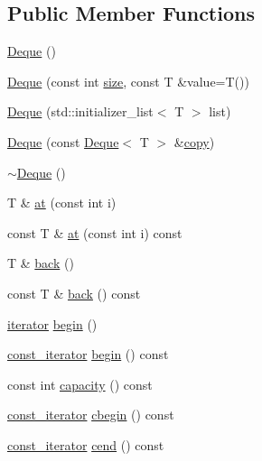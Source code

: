 \subsection*{Public Member Functions}
\begin{DoxyCompactItemize}
\item 
\hyperlink{classprism_1_1_deque_ae8fcffd4a0cf7dba0e33a6983641efc2}{Deque} ()
\item 
\hyperlink{classprism_1_1_deque_ac73ef5f071e6dfddf1f5e8a123752d3e}{Deque} (const int \hyperlink{classprism_1_1_deque_a38e141650506c5b320093c5bd5486a8c}{size}, const T \&value=T())
\item 
\hyperlink{classprism_1_1_deque_aa8c11433e26904fb8a46b912ea6617cf}{Deque} (std\+::initializer\+\_\+list$<$ T $>$ list)
\item 
\hyperlink{classprism_1_1_deque_abaa7ff51e27ef7acb0ca1afe523e7976}{Deque} (const \hyperlink{classprism_1_1_deque}{Deque}$<$ T $>$ \&\hyperlink{namespaceprism_ae776f4cd825f79e7af1cf6ee1d90a209}{copy})
\item 
\hyperlink{classprism_1_1_deque_a2a06b6247712d843c6f23df8ba807ca7}{$\sim$\+Deque} ()
\item 
T \& \hyperlink{classprism_1_1_deque_ab9a3b07245129d260da5d7c7c2aae0e9}{at} (const int i)
\item 
const T \& \hyperlink{classprism_1_1_deque_a6135342d2a41a6963feb2f2405b61930}{at} (const int i) const 
\item 
T \& \hyperlink{classprism_1_1_deque_a5d2f7cc35715a70ca9cd08867abc5683}{back} ()
\item 
const T \& \hyperlink{classprism_1_1_deque_acafb3ab76c43c84c35ba91a7b12d54d0}{back} () const 
\item 
\hyperlink{classprism_1_1_deque_af6fbdfa6e826f7f71b29f4d3cfb72ed1}{iterator} \hyperlink{classprism_1_1_deque_a8d0711ff8a7e810cad9b535c79b7f9b7}{begin} ()
\item 
\hyperlink{classprism_1_1_deque_afc2f71fd5b01e963e093f64cc4da94ec}{const\+\_\+iterator} \hyperlink{classprism_1_1_deque_afbb49ba1e2b3e2d59317625675f73106}{begin} () const 
\item 
const int \hyperlink{classprism_1_1_deque_ad787f6064309077863076b7a3c97d1c4}{capacity} () const 
\item 
\hyperlink{classprism_1_1_deque_afc2f71fd5b01e963e093f64cc4da94ec}{const\+\_\+iterator} \hyperlink{classprism_1_1_deque_a9d8d0e555a7113116643c8300bcc2085}{cbegin} () const 
\item 
\hyperlink{classprism_1_1_deque_afc2f71fd5b01e963e093f64cc4da94ec}{const\+\_\+iterator} \hyperlink{classprism_1_1_deque_a6514222d4c6ae657ab4e773c2d33246c}{cend} () const 

\end{DoxyCompactItemize}
